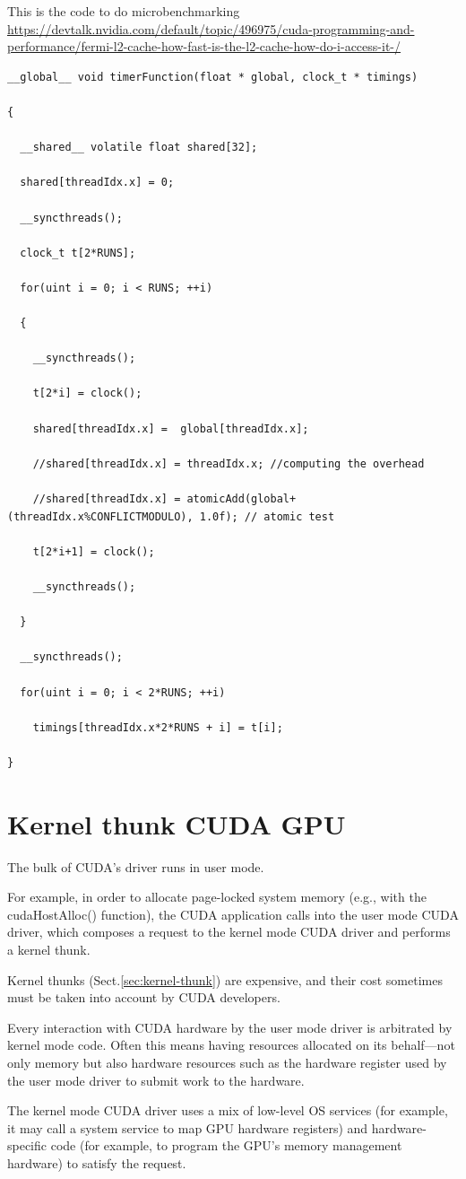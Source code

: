This is the code to do microbenchmarking
\url{https://devtalk.nvidia.com/default/topic/496975/cuda-programming-and-performance/fermi-l2-cache-how-fast-is-the-l2-cache-how-do-i-access-it-/}
\begin{verbatim}
__global__ void timerFunction(float * global, clock_t * timings) 

{

  __shared__ volatile float shared[32];

  shared[threadIdx.x] = 0;

  __syncthreads();

  clock_t t[2*RUNS];

  for(uint i = 0; i < RUNS; ++i)

  {

    __syncthreads();

    t[2*i] = clock();

    shared[threadIdx.x] =  global[threadIdx.x]; 

    //shared[threadIdx.x] = threadIdx.x; //computing the overhead

    //shared[threadIdx.x] = atomicAdd(global+(threadIdx.x%CONFLICTMODULO), 1.0f); // atomic test

    t[2*i+1] = clock();

    __syncthreads();

  }

  __syncthreads();

  for(uint i = 0; i < 2*RUNS; ++i)

    timings[threadIdx.x*2*RUNS + i] = t[i];

} 
\end{verbatim}


\section{Kernel thunk CUDA GPU}
\label{sec:kernel-thunk-CUDA}

The bulk of CUDA’s driver runs in user mode.

For example, in order to allocate page-locked system memory (e.g., with the
cudaHostAlloc() function), the CUDA application calls into the user mode CUDA
driver, which composes a request to the kernel mode CUDA driver and performs a
kernel thunk.


Kernel thunks (Sect.\ref{sec:kernel-thunk}) are expensive, and their cost sometimes
must be taken into account by CUDA developers.

Every interaction with CUDA hardware by the user mode driver is arbitrated by
kernel mode code. Often this means having resources allocated on its behalf—not
only memory but also hardware resources such as the hardware register used by
the user mode driver to submit work to the hardware.


The kernel mode CUDA driver uses a mix of low-level OS services (for example, it
may call a system service to map GPU hardware registers) and hardware-specific
code (for example, to program the GPU’s memory management hardware) to satisfy
the request.


  



